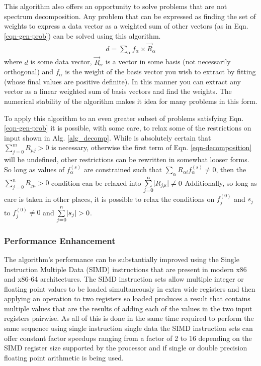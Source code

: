 \documentclass[5p]{elsarticle}
\DeclarePairedDelimiter{\abs}{\lvert}{\rvert}
\begin{document}
This algorithm also offers an opportunity to solve problems that are not spectrum decomposition. Any problem that can be expressed as finding the set of weights to express a data vector as a weighted sum of other vectors (as in Eqn. \ref{eqn-gen-prob}) can be solved using this algorithm.
\textsc{\begin{align}
d = \sum\limits_{\alpha}f_{\alpha}\times{}\vec{R}_{\alpha}
\label{eqn-gen-prob}
\end{align}}
where $d$ is some data vector, $\vec{R}_{\alpha}$ is a vector in some basis (not necessarily orthogonal) and $f_{\alpha}$ is the weight of the basis vector you wish to extract by fitting (whose final values are positive definite). In this manner you can extract any vector as a linear weighted sum of basis vectors and find the weights. The numerical stability of the algorithm makes it idea for many problems in this form.

To apply this algorithm to an even greater subset of problems satisfying Eqn. \ref{eqn-gen-prob} it is possible, with some care, to relax some of the restrictions on input shown in Alg. \ref{alg_decomp}. While is absolutely certain that $\sum\limits_{j=0}^{m}R_{\mu{}j} > 0$ is necessary, otherwise the first term of Eqn. \ref{eqn-decomposition} will be undefined, other restrictions can be rewritten in somewhat looser forms. So long as values of $f_{\alpha}^{(s)}$ are constrained such that $\sum\limits_{\alpha}R_{\alpha{}i}f_{\alpha}^{(s)} \neq{} 0$, then the $\sum\limits_{j=0}^{n}R_{j\mu{}} > 0$ condition can be relaxed into $\sum\limits_{j=0}^{n}\abs{R_{j\mu{}}} \neq{} 0$ Additionally, so long as care is taken in other places, it is possible to relax the conditions on $f^{(0)}_j$ and $s_j$ to $f^{(0)}_j \neq{0}$ and $\sum\limits_{j=0}^{n}\abs{s_j} > 0$.

\subsubsection{Performance Enhancement}
The algorithm's performance can be substantially improved using the Single Instruction Multiple Data (SIMD) instructions that are present in modern x86 and x86-64 architectures. The SIMD instruction sets allow multiple integer or floating point values to be loaded simultaneously in extra wide registers and then applying an operation to two registers so loaded produces a result that contains multiple values that are the results of adding each of the values in the two input registers pairwise. As all of this is done in the same time required to perform the same sequence using single instruction single data the SIMD instruction sets can offer constant factor speedups ranging from a factor of 2 to 16 depending on the SIMD register size supported by the processor and if single or double precision floating point arithmetic is being used.
\end{document}
